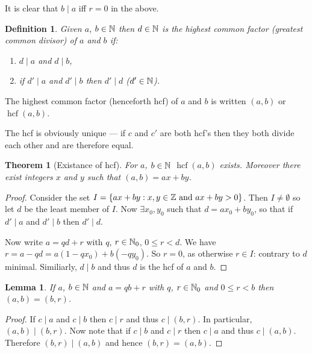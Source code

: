 \documentclass{notes}
\theoremstyle{plain}
\newtheorem{theorem}{Theorem}[chapter]
\newtheorem*{definition}{Definition}
\newtheorem{lemma}{Lemma}[chapter]
\DeclareMathOperator{\hcf}{hcf}
\begin{document}
It is clear that $b \mid a$ iff $r = 0$ in the above.

\begin{definition}
Given $a$, $b \in \mathbb{N}$ then $d \in \mathbb{N}$ is the highest common factor
(greatest common divisor) of $a$ and $b$ if:
\begin{enumerate}
\item $d \mid a$ and $d \mid b$,
\item if $d' \mid a$ and $d' \mid b$ then $d' \mid d$ ($d' \in \mathbb{N}$).
\end{enumerate}
\end{definition}

The highest common factor (henceforth hcf) of $a$ and $b$ is 
written $(a,b)$ or $\hcf (a,b)$.

The hcf is obviously unique --- if $c$ and $c'$ are both hcf's then
they both divide each other and are therefore equal.

\begin{theorem}[Existance of hcf]\label{T:exthcf}
For $a$, $b \in \mathbb{N}$ $\hcf (a,b)$ exists.  Moreover there exist integers
$x$ and $y$ such that $(a,b) = a x + b y$.
\end{theorem}

\begin{proof}
Consider the set $I = \{ a x + b y : x,y \in \mathbb{Z} \text{ and }
a x + b y > 0 \}$.  Then $I \neq \emptyset$ so let $d$ be the least
member of $I$.  Now $\exists x_0, y_0$ such that
$ d = a x_0 + b y_0$, so that if $d' \mid a$ and $d' \mid b$ then
$d' \mid d$.

Now write $a = q d + r$ with $q$, $r \in \mathbb{N}_0$, $0 \le r < d$.  We
have $r = a - qd = a ( 1 - q x_0) + b( -q y_0)$.  So $r = 0$, as otherwise
$r \in I$: contrary to $d$ minimal.  Similiarly, $d \mid b$ and thus
$d$ is the hcf of $a$ and $b$.
\end{proof}

\begin{lemma}\label{L:toeuc}
If $a$, $b \in \mathbb{N}$ and $a = q b + r$ with $q$, $r \in \mathbb{N}_0$ and
$0 \le r < b$ then $(a,b) = (b,r)$.
\end{lemma}

\begin{proof}
If $c \mid a$ and $c \mid b$ then $c \mid r$ and thus $c \mid (b,r)$.
In particular, $(a,b) \mid (b,r)$.  Now note that if $c \mid b$ and
$c \mid r$ then $c \mid a$ and thus $c \mid (a,b)$.  Therefore
$(b,r) \mid (a,b)$ and hence $(b,r) = (a,b)$.
\end{proof}
\end{document}

